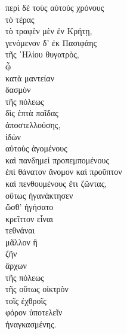 {\large
\begin{greek}
\noindent περὶ δὲ τοὺς αὐτοὺς χρόνους \\
τὸ τέρας \\
\tabto{2em} τὸ τραφὲν μὲν ἐν Κρήτῃ, \\
\tabto{2em} γενόμενον δ' ἐκ Πασιφάης \\
\tabto{4em} τῆς ῾Ηλίου θυγατρὸς, \\

\tabto{2em} ᾧ \\
\tabto{4em} κατὰ μαντείαν \\
\tabto{2em} δασμὸν \\
\tabto{4em} τῆς πόλεως \\
\tabto{2em} δὶς ἑπτὰ παῖδας \\
\tabto{4em} ἀποστελλούσης, \\
ἰδὼν \\
\tabto{2em} αὐτοὺς ἀγομένους \\
\tabto{2em} καὶ πανδημεὶ προπεμπομένους \\
\tabto{4em} ἐπὶ θάνατον ἄνομον καὶ προῦπτον \\
\tabto{2em} καὶ πενθουμένους ἔτι ζῶντας, \\
οὕτως ἠγανάκτησεν \\
\tabto{2em} ὥσθ' ἡγήσατο \\
\tabto{4em} κρεῖττον εἶναι \\
\tabto{6em} τεθνάναι \\
\tabto{4em} μᾶλλον ἢ\\
\tabto{6em} ζῆν \\
\tabto{6em} ἄρχων \\
\tabto{8em} τῆς πόλεως \\
\tabto{10em} τῆς οὕτως οἰκτρὸν \\
\tabto{12em} τοῖς ἐχθροῖς \\
\tabto{12em} φόρον ὑποτελεῖν \\
\tabto{10em} ἠναγκασμένης. \\

\end{greek}
}

